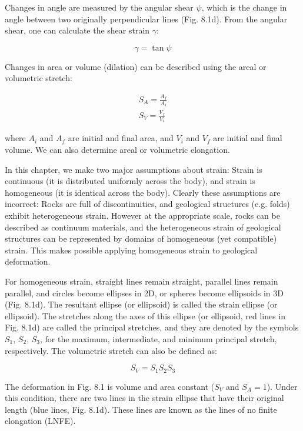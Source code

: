 \documentclass[a4paper , 12pt]{book}
\begin{document}
Changes in angle are measured by the angular shear $\psi$, which is the change in angle between two originally perpendicular lines (Fig. 8.1d). From the angular shear, one can calculate the shear strain $\gamma$:

\begin{equation}
    \gamma = \tan\psi
\end{equation}

Changes in area or volume (dilation) can be described using the areal or volumetric stretch:

\begin{equation}
    \begin{gathered}
        S_A = \frac{A_f}{A_i} \\
        S_V = \frac{V_f}{V_i}
    \end{gathered}
\end{equation}

where $A_i$ and $A_f$ are initial and final area, and $V_i$ and $V_f$ are initial and final volume. We can also determine areal or volumetric elongation.

In this chapter, we make two major assumptions about strain: Strain is continuous (it is distributed uniformly across the body), and strain is homogeneous (it is identical across the body). Clearly these assumptions are incorrect: Rocks are full of discontinuities, and geological structures (e.g. folds) exhibit heterogeneous strain. However at the appropriate scale, rocks can be described as continuum materials, and the heterogeneous strain of geological structures can be represented by domains of homogeneous (yet compatible) strain. This makes possible applying homogeneous strain to geological deformation.

For homogeneous strain, straight lines remain straight, parallel lines remain parallel, and circles become ellipses in 2D, or spheres become ellipsoids in 3D (Fig. 8.1d). The resultant ellipse (or ellipsoid) is called the strain ellipse (or ellipsoid). The stretches along the axes of this ellipse (or ellipsoid, red lines in Fig. 8.1d) are called the principal stretches, and they are denoted by the symbols $S_1$, $S_2$, $S_3$, for the maximum, intermediate, and minimum principal stretch, respectively. The volumetric stretch can also be defined as:

\begin{equation}
    S_V = S_1S_2S_3
\end{equation}

The deformation in Fig. 8.1 is volume and area constant ($S_V$ and $S_A = 1$). Under this condition, there are two lines in the strain ellipse that have their original length (blue lines, Fig. 8.1d). These lines are known as the lines of no finite elongation (LNFE).
\end{document}
